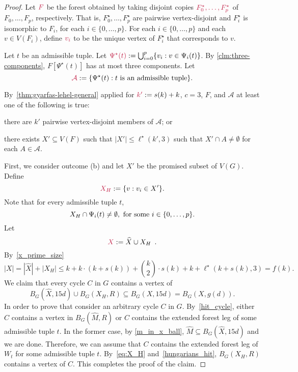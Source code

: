 \documentclass{patmorin}
\DeclarePairedDelimiter\set{\{}{\}}
\begin{document}
\begin{proof}
Let $\mathdefin{F}$ be the forest obtained by taking 
disjoint copies $\mathdefin{F_0^\star,\ldots, F_p^\star}$ of $F_0,\ldots, F_p$, respectively.  That is,  $F_0^\star,\ldots, F_p^\star$ are pairwise vertex-disjoint and $F_i^\star$ is isomorphic to $F_i$, for each $i\in\{0,\ldots,p\}$.
For each $i\in\{0,\ldots,p\}$ and each $v\in V(F_i)$, define $\mathdefin{v_i}$ to be the unique vertex of $F^\star_i$ that corresponds to $v$.

Let $t$ be an admissible tuple. 
Let $\mathdefin{\Psi^\star(t)}:=\bigcup_{i=0}^p \{v_i:v\in \Psi_i(t)\}$.
By \cref{clm:three-components}, $F[\Psi^\star(t)]$ has at most three components. 
Let
\[
\mathdefin{\mathcal{A}}:=\{\Psi^\star(t):\text{$t$ is an admissible tuple}\}.
\]

By~\cref{thm:gyarfas-lehel-general} applied for
$\mathdefin{k'}:=s(k)+k$, $c=3$, $F$, and $\mathcal{A}$ at least one of the following is true:
\begin{inparaenum}[(a)]
  \item there are $k'$ pairwise vertex-disjoint members of $\mathcal{A}$; or 
  \item there exists $X'\subseteq V(F)$ such that $|X'|\leq \ell^\star(k',3)$ such that $X' \cap A\neq\emptyset$ for each $A\in \mathcal{A}$.
\end{inparaenum}

First, we consider outcome (b) and let $X'$ be the promised subset of $V(G)$.
Define 
\[
\mathdefin{X_H}:=\set{v:v_i\in X'}.
\]
Note that 
for every admissible tuple $t$,
\begin{equation}\label{eq:X_H}
X_H \cap \Psi_i(t) \neq\emptyset,\ \textrm{for some $i\in\set{0,\ldots,p}$.}
\end{equation}
Let
\[
\mathdefin{X}:=\widehat{X} \cup X_H \enspace .
\]
By~\eqref{x_prime_size}
\[
|X| = |\widehat{X}| + |X_H| \leq \textstyle k + k\cdot (k+s(k)) + \binom{k}{2}\cdot s(k) + k + \ell^\star(k+s(k),3) = f(k).
\]
We claim that every cycle $C$ in $G$ contains a vertex of 
\[
B_G(\widehat{X},15d)\cup B_G(X_H,R)\subseteq B_G(X,15d) = B_G(X,g(d)).
\]
In order to prove that consider an arbitrary cycle $C$ in $G$. 
By~\cref{hit_cycle}, either $C$ contains a vertex in $B_G(\widehat{M},R)$ or $C$ contains the extended forest leg of some admissible tuple $t$. 
In the former case, by \cref{m_in_x_ball}, $\widehat{M}\subseteq B_G(\widehat{X},15d)$ and we are done. 
Therefore, we can assume that $C$ contains the extended forest leg of $W_t$ for some admissible tuple $t$. 
By~\eqref{eq:X_H} and~\cref{hungarians_hit}, 
$B_G(X_H,R)$ contains a vertex of $C$.
This completes the proof of the claim.


\end{proof}
\end{document}
